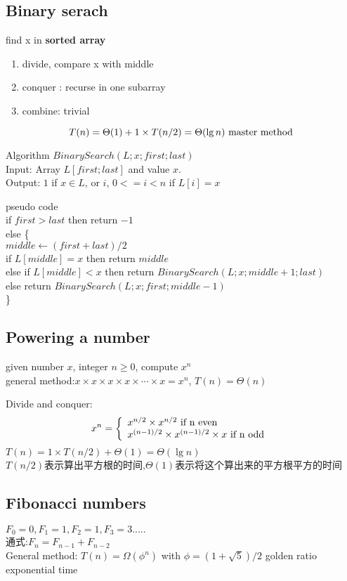 \documentclass{article}
\begin{document}
\subsection{Binary serach}
find x in \textbf{sorted array}
\begin{enumerate}
	\item divide, compare x with middle
	\item conquer : recurse in one subarray
	\item combine: trivial
\end{enumerate}
$$
T(n)=\Theta(1)+1 \times T(n/2) = \Theta(\lg n)	\text{ master method }
$$

Algorithm $BinarySearch(L; x; first; last)$\\
Input: Array $L[first ; last]$ and value $x$.\\
Output: $1$ if $x \in L$, or $i$, $0<=  i < n$ if $L[i] = x$

pseudo code\\
if $first > last$ then return $-1$\\
else \{\\
$middle \leftarrow (first+last)/2$\\
if $L[middle]=x$ then return $middle$\\
else if $L[middle]<x$ then return $BinarySearch(L; x; middle+1; last)$\\
else return $BinarySearch(L; x; first; middle - 1)$\\
\}

\subsection{Powering a number}
given number $x$, integer $n \geq 0$, compute $x^n$\\
general method:$x \times x \times x \times x \times \cdots \times x =x^n$,  $T(n)=\Theta(n)$

Divide and conquer:
$$
x^n =
\left\{
  \begin{array}{ll}
		  x^{n/2} \times x^{n/2}  \text{ if n even }\\
	x^{(n-1)/2} \times x^{(n-1)/2} \times x \text{ if n odd }
  \end{array}
\right.
$$
$T(n)=1 \times T(n/2) +\Theta(1)=\Theta(\lg n)$\\
$T(n/2)$表示算出平方根的时间,$\Theta(1)$表示将这个算出来的平方根平方的时间

\subsection{Fibonacci numbers}
$F_0=0,F_1=1,F_2=1,F_3=3.....$\\
通式:$F_n=F_{n-1} + F_{n-2}$\\
General method: $T(n)=\Omega(\phi^n)$ with $\phi=(1+\sqrt{5})/2$
golden ratio\\
exponential time
\end{document}
